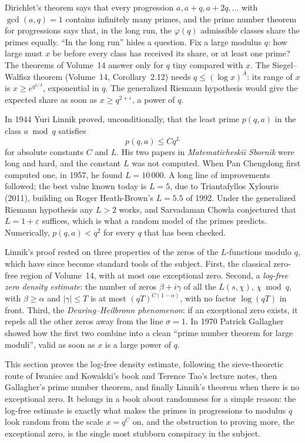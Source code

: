 Dirichlet's theorem says that every progression $a,a+q,a+2q,\dots$ with $\gcd(a,q)=1$ contains infinitely many primes, and the prime number theorem for progressions says that, in the long run, the $\varphi(q)$ admissible classes share the primes equally. ``In the long run'' hides a question. Fix a large modulus $q$: how large must $x$ be before every class has received its share, or at least one prime? The theorems of Volume~14 answer only for $q$ tiny compared with $x$. The Siegel--Walfisz theorem (Volume~14, Corollary~2.12) needs $q\le(\log x)^A$: its range of $x$ is $x\ge e^{q^{1/A}}$, exponential in $q$. The generalized Riemann hypothesis would give the expected share as soon as $x\ge q^{2+\varepsilon}$, a power of $q$.

In 1944 Yuri Linnik proved, unconditionally, that the least prime $p(q,a)$ in the class $a\bmod q$ satisfies
\[
p(q,a)\le Cq^L
\]
for absolute constants $C$ and $L$. His two papers in \emph{Matematicheskii Sbornik} were long and hard, and the constant $L$ was not computed. When Pan Chengdong first computed one, in 1957, he found $L=10\,000$. A long line of improvements followed; the best value known today is $L=5$, due to Triantafyllos Xylouris (2011), building on Roger Heath-Brown's $L=5.5$ of 1992. Under the generalized Riemann hypothesis any $L>2$ works, and Sarvadaman Chowla conjectured that $L=1+\varepsilon$ suffices, which is what a random model of the primes predicts. Numerically, $p(q,a)<q^2$ for every $q$ that has been checked.

Linnik's proof rested on three properties of the zeros of the $L$-functions modulo $q$, which have since become standard tools of the subject. First, the classical zero-free region of Volume~14, with at most one exceptional zero. Second, a \emph{log-free zero density estimate}: the number of zeros $\beta+i\gamma$ of all the $L(s,\chi)$, $\chi\bmod q$, with $\beta\ge\alpha$ and $|\gamma|\le T$ is at most $(qT)^{C(1-\alpha)}$, with no factor $\log(qT)$ in front. Third, the \emph{Deuring--Heilbronn phenomenon}: if an exceptional zero exists, it repels all the other zeros away from the line $\sigma=1$. In 1970 Patrick Gallagher showed how the first two combine into a clean ``prime number theorem for large moduli'', valid as soon as $x$ is a large power of $q$.

This section proves the log-free density estimate, following the sieve-theoretic route of Iwaniec and Kowalski's book and Terence Tao's lecture notes, then Gallagher's prime number theorem, and finally Linnik's theorem when there is no exceptional zero. It belongs in a book about randomness for a simple reason: the log-free estimate is exactly what makes the primes in progressions to modulus $q$ look random from the scale $x=q^{C}$ on, and the obstruction to proving more, the exceptional zero, is the single most stubborn conspiracy in the subject.

